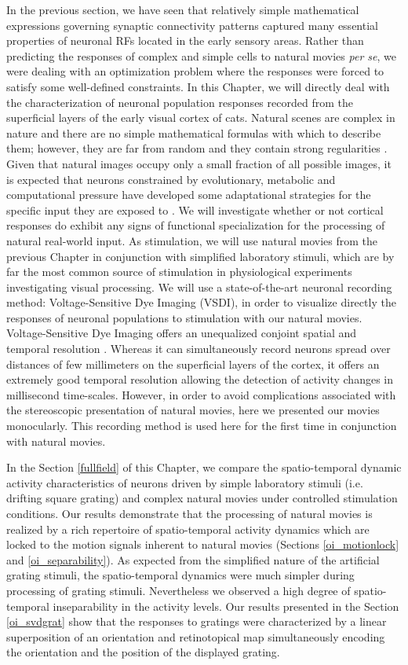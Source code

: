 In the previous section, we have seen that relatively simple mathematical
expressions governing synaptic connectivity patterns captured many
essential properties of neuronal RFs located in the early sensory areas.
Rather than predicting the responses of complex and simple cells to natural
movies \textit{per se}, we were dealing with an optimization problem where
the responses were forced to satisfy some well-defined constraints. In this
Chapter, we will directly deal with the characterization of neuronal
population responses recorded from the superficial layers of the early
visual cortex of cats. Natural scenes are complex in nature and there are
no simple mathematical formulas with which to describe them; however, they
are far from random and they contain strong regularities
\citep{chandler2007a}.  Given that natural images occupy only a small
fraction of all possible images, it is expected that neurons constrained by
evolutionary, metabolic and computational pressure have developed some
adaptational strategies for the specific input they are exposed to
\citep{graham2009a}.  We will investigate whether or not cortical responses
do exhibit any signs of functional specialization for the processing of
natural real-world input. As stimulation, we will use natural movies from
the previous Chapter in conjunction with simplified laboratory stimuli,
which are by far the most common source of stimulation in physiological
experiments investigating visual processing. We will use a state-of-the-art
neuronal recording method: Voltage-Sensitive Dye Imaging (VSDI), in order
to visualize directly the responses of neuronal populations to stimulation
with our natural movies. Voltage-Sensitive Dye Imaging offers an
unequalized conjoint spatial and temporal resolution \citep{grinvald2004b}.
Whereas it can simultaneously record neurons spread over distances of few
millimeters on the superficial layers of the cortex, it offers an extremely
good temporal resolution allowing the detection of activity changes in
millisecond time-scales.  However, in order to avoid complications
associated with the stereoscopic presentation of natural movies, here we
presented our movies monocularly.  This recording method is used here for
the first time in conjunction with natural movies.


In the Section \ref{fullfield} of this Chapter, we compare the
spatio-temporal dynamic activity characteristics of neurons driven by
simple laboratory stimuli (i.e. drifting square grating) and complex
natural movies under controlled stimulation conditions. Our results
demonstrate that the processing of natural movies is realized by a rich
repertoire of spatio-temporal activity dynamics which are locked to the
motion signals inherent to natural movies (Sections \ref{oi_motionlock} and
\ref{oi_separability}). As expected from the simplified nature of the
artificial grating stimuli, the spatio-temporal dynamics were much simpler
during processing of grating stimuli. Nevertheless we observed a high
degree of spatio-temporal inseparability in the activity levels. Our
results presented in the Section \ref{oi_svdgrat} show that the responses
to gratings were characterized by a linear superposition of an orientation
and retinotopical map simultaneously encoding the orientation and the
position of the displayed grating.

